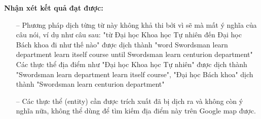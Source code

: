 \begin{table}[]
\begin{center}
\end{center}
\caption{Minh họa dữ liệu trước khi dịch và sau khi dịch}
    \label{fig:trainingdata_dichtungtu}
\end{table}

\textbf{Nhận xét kết quả đạt được:}
\begin{itemize}
    \item[--] Phương pháp dịch từng từ này không khả thi bởi vì sẽ mà mất ý nghĩa của câu nói, ví dụ như câu sau: "từ Đại học Khoa học Tự nhiên đến Đại học Bách khoa đi như thế nào" được dịch thành "word Swordsman learn department learn itself course until Swordsman learn centurion department" Các thực thể địa điểm như "Đại học Khoa học Tự nhiên" được dịch thành "Swordsman learn department learn itself course", "Đại học Bách khoa" dịch thành "Swordsman learn centurion department"
    \item[--] Các thực thể (entity) cần được trích xuất đã bị dịch ra và không còn ý nghĩa nữa, không thể dùng để tìm kiếm địa điểm này trên Google map được.
\end{itemize}
